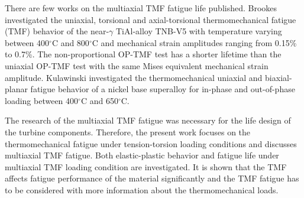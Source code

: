 There are few works on the multiaxial TMF fatigue life published.
Brookes \cite{brookes2010axial} investigated the uniaxial, torsional and axial-torsional thermomechanical fatigue (TMF) behavior of the near-$\gamma$ TiAl-alloy TNB-V5 with temperature varying between 400$^{\circ}$C and 800$^{\circ}$C and mechanical strain amplitudes ranging from 0.15\% to 0.7\%. The non-proportional OP-TMF test has a shorter lifetime than the uniaxial OP-TMF test with the same Mises equivalent mechanical strain amplitude.
Kulawinski \cite{Kulawinski201521} investigated the thermomechanical uniaxial and biaxial-planar fatigue behavior of a nickel base superalloy for in-phase and out-of-phase loading between 400$^{\circ}$C and 650$^{\circ}$C.

The research of the multiaxial TMF fatigue was necessary for the life design of the turbine components. Therefore, the present work focuses on the thermomechanical fatigue under tension-torsion loading conditions and discusses multiaxial TMF fatigue. Both elastic-plastic behavior and fatigue life under multiaxial TMF loading condition are investigated. It is shown that the TMF affects fatigue performance of the material significantly and the TMF fatigue has to be considered with more information about the thermomechanical loads.




